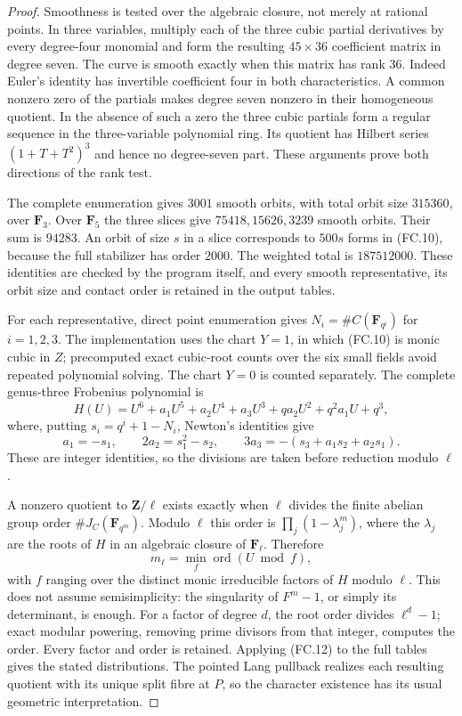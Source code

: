 \begin{proof}
Smoothness is tested over the algebraic closure, not merely at
rational points. In three variables, multiply each of the three
cubic partial derivatives by every degree-four monomial and form
the resulting $45\times36$ coefficient matrix in degree seven.
The curve is smooth exactly when this matrix has rank $36$.
Indeed Euler's identity has invertible coefficient four in both
characteristics. A common nonzero zero of the partials makes degree
seven nonzero in their homogeneous quotient. In the absence of such
a zero the three cubic partials form a regular sequence in the
three-variable polynomial ring. Its quotient has Hilbert series
$(1+T+T^2)^3$ and hence no degree-seven part. These arguments prove
both directions of the rank test.

The complete enumeration gives $3001$ smooth orbits, with total
orbit size $315360$, over $\mathbf F _3$. Over $\mathbf F _5$ the
three slices give $75418,15626,3239$ smooth orbits. Their sum is
$94283$. An orbit of size $s$ in a slice corresponds to $500s$
forms in (FC.10), because the full stabilizer has order $2000$.
The weighted total is $187512000$. These identities are checked
by the program itself, and every smooth representative, its orbit
size and contact order is retained in the output tables.

For each representative, direct point enumeration gives
$N_i=\#C(\mathbf F _{q^i})$ for $i=1,2,3$. The implementation
uses the chart $Y=1$, in which (FC.10) is monic cubic in $Z$;
precomputed exact cubic-root counts over the six small fields
avoid repeated polynomial solving. The chart $Y=0$ is counted
separately. The complete genus-three Frobenius polynomial is
\[
 H(U)=U^6+a_1U^5+a_2U^4+a_3U^3+qa_2U^2+q^2a_1U+q^3,
\]
where, putting $s_i=q^i+1-N_i$, Newton's identities give
\[
 a_1=-s_1,\qquad
 2a_2=s_1^2-s_2,\qquad
 3a_3=-(s_3+a_1s_2+a_2s_1).
\]
These are integer identities, so the divisions are taken before
reduction modulo $\ell$.

A nonzero quotient to $\mathbf Z/\ell$ exists exactly when
$\ell$ divides the finite abelian group order
$\#J_C(\mathbf F _{q^m})$. Modulo $\ell$ this order is
$\prod_j(1-\lambda_j^m)$, where the $\lambda_j$ are the roots
of $H$ in an algebraic closure of $\mathbf F _\ell$. Therefore
\[
 m_\ell=\min_f\operatorname{ord}(U\bmod f),                  \tag{FC.12}
\]
with $f$ ranging over the distinct monic irreducible factors of
$H$ modulo $\ell$. This does not assume semisimplicity: the
singularity of $F^m-1$, or simply its determinant, is enough.
For a factor of degree $d$, the root order divides $\ell^d-1$;
exact modular powering, removing prime divisors from that integer,
computes the order. Every factor and order is retained. Applying
(FC.12) to the full tables gives the stated distributions.
The pointed Lang pullback realizes each resulting quotient with
its unique split fibre at $P$, so the character existence has its
usual geometric interpretation.
\end{proof}

